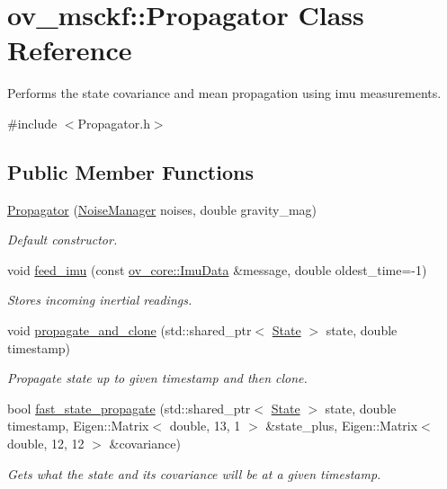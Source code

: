 \hypertarget{classov__msckf_1_1Propagator}{}\section{ov\+\_\+msckf\+:\+:Propagator Class Reference}
\label{classov__msckf_1_1Propagator}


Performs the state covariance and mean propagation using imu measurements.  




{\ttfamily \#include $<$Propagator.\+h$>$}

\subsection*{Public Member Functions}
\begin{DoxyCompactItemize}
\item 
\hyperlink{classov__msckf_1_1Propagator_a041751e94b04af4134c31a5f32c58d47}{Propagator} (\hyperlink{structov__msckf_1_1NoiseManager}{Noise\+Manager} noises, double gravity\+\_\+mag)
\begin{DoxyCompactList}\small\item\em Default constructor. \end{DoxyCompactList}\item 
void \hyperlink{classov__msckf_1_1Propagator_aa9badf8180a77869e6027d359af8121e}{feed\+\_\+imu} (const \hyperlink{structov__core_1_1ImuData}{ov\+\_\+core\+::\+Imu\+Data} \&message, double oldest\+\_\+time=-\/1)
\begin{DoxyCompactList}\small\item\em Stores incoming inertial readings. \end{DoxyCompactList}\item 
void \hyperlink{classov__msckf_1_1Propagator_ac96e7c40b696501a1f68097e10dde319}{propagate\+\_\+and\+\_\+clone} (std\+::shared\+\_\+ptr$<$ \hyperlink{classov__msckf_1_1State}{State} $>$ state, double timestamp)
\begin{DoxyCompactList}\small\item\em Propagate state up to given timestamp and then clone. \end{DoxyCompactList}\item 
bool \hyperlink{classov__msckf_1_1Propagator_a33aabf2aea886a848a5ea3f6d83be4a4}{fast\+\_\+state\+\_\+propagate} (std\+::shared\+\_\+ptr$<$ \hyperlink{classov__msckf_1_1State}{State} $>$ state, double timestamp, Eigen\+::\+Matrix$<$ double, 13, 1 $>$ \&state\+\_\+plus, Eigen\+::\+Matrix$<$ double, 12, 12 $>$ \&covariance)
\begin{DoxyCompactList}\small\item\em Gets what the state and its covariance will be at a given timestamp. \end{DoxyCompactList}\end{DoxyCompactItemize}
